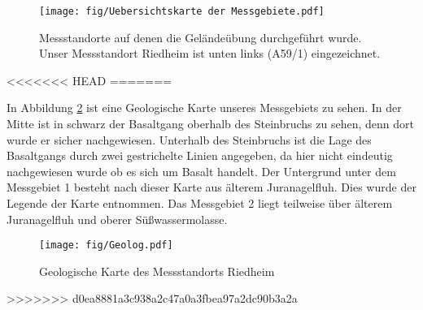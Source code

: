\begin{figure}[h]
 \centering
 \texttt{[image: fig/Uebersichtskarte der Messgebiete.pdf]}
 \caption[Messgebiete]{Messstandorte auf denen die Geländeübung durchgeführt wurde. Unser Messstandort Riedheim ist unten links (A59/1) eingezeichnet.}
 \label{abb:Messgebiete}
\end{figure}
<<<<<<< HEAD
=======

In Abbildung \ref{abb:Geolog} ist eine Geologische Karte unseres Messgebiets zu sehen. In der Mitte ist in schwarz der Basaltgang oberhalb des Steinbruchs zu sehen, denn dort wurde er sicher nachgewiesen.
Unterhalb des Steinbruchs ist die Lage des Basaltgangs durch zwei gestrichelte Linien angegeben, da hier nicht eindeutig nachgewiesen wurde ob es sich um Basalt handelt. Der Untergrund unter dem Messgebiet 1 besteht nach dieser Karte aus älterem Juranagelfluh. Dies wurde der Legende der Karte entnommen. Das Messgebiet 2 liegt teilweise über älterem Juranagelfluh und oberer Süßwassermolasse.

\begin{figure}
 \centering
 \texttt{[image: fig/Geolog.pdf]}
 \caption[Geologische Karte]{Geologische Karte des Messstandorts Riedheim}
 \label{abb:Geolog}
\end{figure}


>>>>>>> d0ea8881a3c938a2c47a0a3fbea97a2dc90b3a2a
